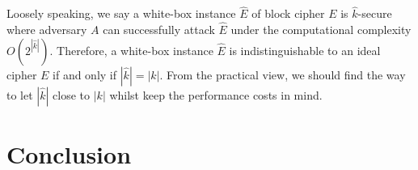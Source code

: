 \documentclass{SCIS2018}
\begin{document}

Loosely speaking, we say a white-box instance $\hat{E}$ of block cipher $E$ is $\hat{k}$-secure where adversary $A$ can successfully attack $\hat{E}$ under the computational complexity $O(2^{|\hat{k}|})$. Therefore, a white-box instance $\hat{E}$ is indistinguishable to an ideal cipher $E$ if and only if $|\hat{k}| = |k|$. From the practical view, we should find the way to let $|\hat{k}|$ close to $|k|$ whilst keep the performance costs in mind.



\section{Conclusion}








\end{document}

